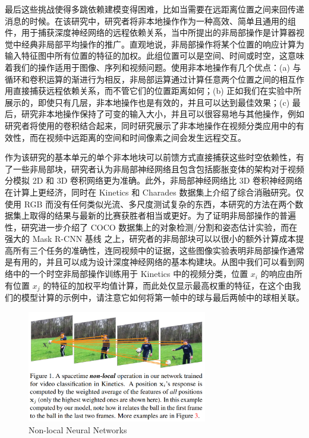 最后这些挑战使得多跳依赖建模变得困难，比如当需要在远距离位置之间来回传递消息的时候。在该研究中，研究者将非本地操作作为一种高效、简单且通用的组件，用于捕获深度神经网络的远程依赖关系，当中所提出的非局部操作是计算器视觉中经典非局部平均操作的推广。直观地说，非局部操作将某个位置的响应计算为输入特征图中所有位置的特征的加权。此组位置可以是空间、时间或时空，这意味着我们的操作适用于图像、序列和视频问题。使用非本地操作有几个优点：(a) 与循环和卷积运算的渐进行为相反，非局部运算通过计算任意两个位置之间的相互作用直接捕获远程依赖关系，而不管它们的位置距离如何；(b) 正如我们在实验中所展示的，即使只有几层，非本地操作也是有效的，并且可以达到最佳效果；(c) 最后，研究非本地操作保持了可变的输入大小，并且可以很容易地与其他操作，例如研究者将使用的卷积结合起来，同时研究展示了非本地操作在视频分类应用中的有效性，而在视频中远距离的空间和时间像素之间会发生远程交互。

作为该研究的基本单元的单个非本地块可以前馈方式直接捕获这些时空依赖性，有了一些非局部块，研究者认为非局部神经网络且包含包括膨胀变体的架构对于视频分模拟 2D 和 3D 卷积网络更为准确。此外，非局部神经网络比 3D 卷积神经网络在计算上更经济，同时在 Kinetics 和 Charades 数据集上介绍了综合消融研究。仅使用 RGB 而没有任何类似光流、多尺度测试复杂的东西，本研究的方法在两个数据集上取得的结果与最新的比赛获胜者相当或更好。为了证明非局部操作的普遍性，研究进一步介绍了 COCO 数据集上的对象检测/分割和姿态估计实验，而在强大的 Mask R-CNN 基线 之上，研究者的非局部块可以以很小的额外计算成本提高所有三个任务的准确性，连同视频中的证据，这些图像实验表明非局部操作通常是有用的，并且可以成为设计深度神经网络的基本构建块。从图中我们可以看到网络中的一个时空非局部操作训练用于 Kinetics 中的视频分类，位置 $x_{i}$ 的响应由所有位置 $x_{j}$ 的特征的加权平均值计算，而此处仅显示最高权重的特征，在这个由我们的模型计算的示例中，请注意它如何将第一帧中的球与最后两帧中的球相关联。

\begin{figure}[htb]
\centering 
\includegraphics[width=0.7\textwidth]{img/pa3.png} 
\caption{Non-local Neural Networks}
\label{Test}
\end{figure}

